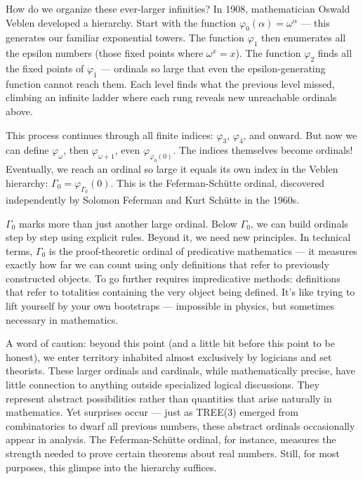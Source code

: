 How do we organize these ever-larger infinities? In 1908, mathematician Oswald Veblen developed a hierarchy. Start with the function $\varphi_0(\alpha) = \omega^\alpha$ — this generates our familiar exponential towers. The function $\varphi_1$ then enumerates all the epsilon numbers (those fixed points where $\omega^x = x$). The function $\varphi_2$ finds all the fixed points of $\varphi_1$ — ordinals so large that even the epsilon-generating function cannot reach them. Each level finds what the previous level missed, climbing an infinite ladder where each rung reveals new unreachable ordinals above.

This process continues through all finite indices: $\varphi_3$, $\varphi_4$, and onward. But now we can define $\varphi_\omega$, then $\varphi_{\omega+1}$, even $\varphi_{\varphi_0(0)}$. The indices themselves become ordinals! Eventually, we reach an ordinal so large it equals its own index in the Veblen hierarchy: $\Gamma_0 = \varphi_{\Gamma_0}(0)$. This is the Feferman-Schütte ordinal, discovered independently by Solomon Feferman and Kurt Schütte in the 1960s.

$\Gamma_0$ marks more than just another large ordinal. Below $\Gamma_0$, we can build ordinals step by step using explicit rules. Beyond it, we need new principles. In technical terms, $\Gamma_0$ is the proof-theoretic ordinal of predicative mathematics — it measures exactly how far we can count using only definitions that refer to previously constructed objects. To go further requires impredicative methods: definitions that refer to totalities containing the very object being defined. It's like trying to lift yourself by your own bootstraps — impossible in physics, but sometimes necessary in mathematics.

A word of caution: beyond this point (and a little bit before this point to be honest), we enter territory inhabited almost exclusively by logicians and set theorists. These larger ordinals and cardinals, while mathematically precise, have little connection to anything outside specialized logical discussions. They represent abstract possibilities rather than quantities that arise naturally in mathematics. Yet surprises occur — just as TREE(3) emerged from combinatorics to dwarf all previous numbers, these abstract ordinals occasionally appear in analysis. The Feferman-Schütte ordinal, for instance, measures the strength needed to prove certain theorems about real numbers. Still, for most purposes, this glimpse into the hierarchy suffices.

